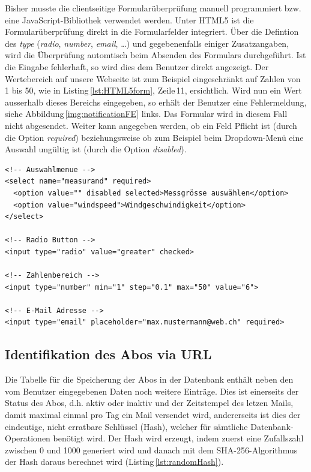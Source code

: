 \noindent
Bisher musste die clientseitige Formularüberprüfung manuell programmiert bzw. eine JavaScript-Bibliothek verwendet werden. Unter HTML5 ist die Formularüberprüfung direkt in die Formularfelder integriert. Über die Defintion des \emph{type} (\emph{radio}, \emph{number}, \emph{email}, \dots) und gegebenenfalls einiger Zusatzangaben, wird die Überprüfung automtisch beim Absenden des Formulars durchgeführt. Ist die Eingabe fehlerhaft, so wird dies dem Benutzer direkt angezeigt. Der Wertebereich auf unsere Webseite ist zum Beispiel eingeschränkt auf Zahlen von 1 bis 50, wie in Listing\,\ref{lst:HTML5form}, Zeile\,11, ersichtlich. Wird nun ein Wert ausserhalb dieses Bereichs eingegeben, so erhält der Benutzer eine Fehlermeldung, siehe Abbildung\,\ref{img:notificationFE} links. Das Formular wird in diesem Fall nicht abgesendet. Weiter kann angegeben werden, ob ein Feld Pflicht ist (durch die Option \emph{required}) beziehungsweise ob zum Beispiel beim Dropdown-Menü eine Auswahl ungültig ist (durch die Option \emph{disabled}).

\vspace{3mm}
\begin{lstlisting}[label=lst:HTML5form,caption=Integrierte Formularüberprüfung mit HTML5, language=HTML5, style=htmlcssjs]
<!-- Auswahlmenue -->
<select name="measurand" required>
  <option value="" disabled selected>Messgrösse auswählen</option>
  <option value="windspeed">Windgeschwindigkeit</option>
</select>

<!-- Radio Button -->
<input type="radio" value="greater" checked>

<!-- Zahlenbereich -->
<input type="number" min="1" step="0.1" max="50" value="6">

<!-- E-Mail Adresse -->
<input type="email" placeholder="max.mustermann@web.ch" required>
\end{lstlisting}
\vspace{3mm}

\subsection{Identifikation des Abos via URL}
Die Tabelle für die Speicherung der Abos in der Datenbank enthält neben den vom Benutzer eingegebenen Daten noch weitere Einträge. Dies ist einerseits der Status des Abos, d.h. aktiv oder inaktiv und der Zeitstempel des letzen Mails, damit maximal einmal pro Tag ein Mail versendet wird, andererseits ist dies der eindeutige, nicht erratbare Schlüssel (Hash), welcher für sämtliche Datenbank-Operationen benötigt wird. Der Hash wird erzeugt, indem zuerst eine Zufallszahl zwischen 0 und 1000 generiert wird und danach mit dem SHA-256-Algorithmus der Hash daraus berechnet wird (Listing\,\ref{lst:randomHash}).

